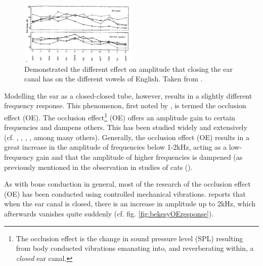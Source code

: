 \documentclass[dissertation,copyright]{uathesis}
\begin{document}
\begin{figure}
\includegraphics[width=0.5\textwidth]{figure/bekesy60-3.png}
\caption{Demonstrated the different effect on amplitude that closing the ear canal has on the different vowels of English.  Taken from \cite{bekesy:60}.}
\label{bekesyPhoneDiff}
\end{figure}


Modelling the ear as a closed-closed tube, however, results in a slightly different frequency response.  This phenomenon, first noted by \cite{wheatstone:79}, is termed the occlusion effect (OE).  The occlusion effect\footnote{The occlusion effect is the change in sound pressure level (SPL) resulting from body conducted vibrations emanating into, and reverberating within, a \textit{closed} ear canal.} (OE) offers an amplitude gain to certain frequencies and dampens others.  This has been studied widely and extensively (cf. \cite{wheatstone:79}, \cite{kelly:37}, \cite{littler:52}, \cite{goldstein:65}, among many others).  Generally, the occlusion effect (OE) results in a great increase in the amplitude of frequencies below 1-2kHz, acting as a low-frequency gain and that the amplitude of higher frequencies is dampened (as previously mentioned in the observation in studies of cats (\cite{tonndorf:72}).


 
As with bone conduction in general, most of the research of the occlusion effect (OE) has been conducted using controlled mechanical vibrations.  \cite{bekesy:60} reports that when the ear canal is closed, there is an increase in amplitude up to 2kHz, which afterwards vanishes quite suddenly (cf. fig. \ref{fig:bekesyOEresponse}).
\end{document}
